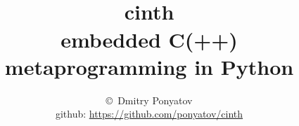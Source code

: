 

\title{\ \\{\Huge cinth}\\embedded C(++) \\metaprogramming in Python}

\author{\copyright\ Dmitry Ponyatov \\
github: \url{https://github.com/ponyatov/cinth}}



\maketitle

\tableofcontents

\secdown






